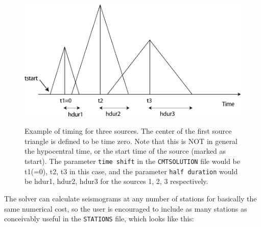\documentclass[oneside,english]{book}
\begin{document}
{\small }%
\begin{figure}[H]
\noindent \begin{centering}
{\small \includegraphics[width=5in]{figures/source_timing} }
\par\end{centering}{\small \par}

\caption{Example of timing for three sources. The center of the first source
triangle is defined to be time zero. Note that this is NOT in general
the hypocentral time, or the start time of the source (marked as tstart).
The parameter \texttt{time shift} in the \texttt{CMTSOLUTION} file
would be t1(=0), t2, t3 in this case, and the parameter \texttt{half
duration} would be hdur1, hdur2, hdur3 for the sources 1, 2, 3 respectively.}


{\small \label{fig:source_timing} }
\end{figure}
{\small \par}

The solver can calculate seismograms at any number of stations for
basically the same numerical cost, so the user is encouraged to include
as many stations as conceivably useful in the \texttt{STATIONS} file,
which looks like this:
\end{document}
